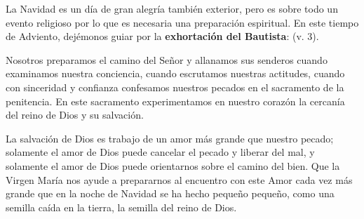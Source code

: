 \begin{body}
	La Navidad es un día de gran alegría también exterior, pero es sobre todo un evento religioso por lo que es necesaria una preparación espiritual. En este tiempo de Adviento, dejémonos guiar por la \textbf{exhortación del Bautista}:  (v. 3).
	
	Nosotros preparamos el camino del Señor y allanamos sus senderos cuando examinamos nuestra conciencia, cuando escrutamos nuestras actitudes, cuando con sinceridad y confianza confesamos nuestros pecados en el sacramento de la penitencia. En este sacramento experimentamos en nuestro corazón la cercanía del reino de Dios y su salvación.
	
	La salvación de Dios es trabajo de un amor más grande que nuestro pecado; solamente el amor de Dios puede cancelar el pecado y liberar del mal, y solamente el amor de Dios puede orientarnos sobre el camino del bien. Que la Virgen María nos ayude a prepararnos al encuentro con este Amor cada vez más grande que en la noche de Navidad se ha hecho pequeño pequeño, como una semilla caída en la tierra, la semilla del reino de Dios.
\end{body}		

